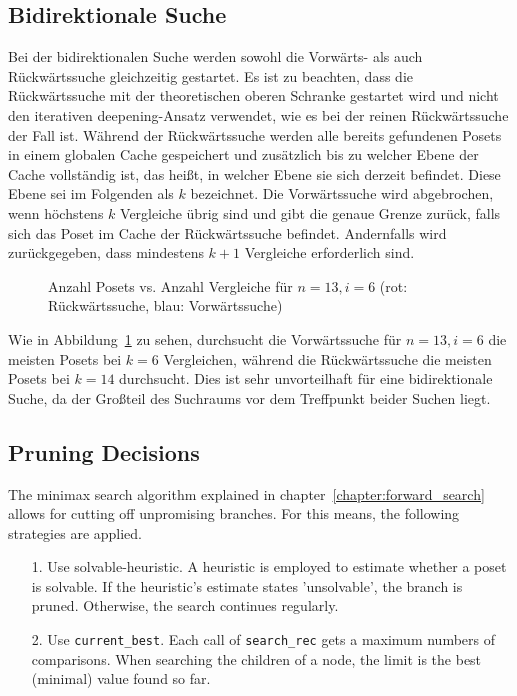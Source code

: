 \documentclass[10pt,journal,compsoc]{IEEEtran}
\begin{document}
\subsection{Bidirektionale Suche} \label{sec:bidirectional}

Bei der bidirektionalen Suche werden sowohl die Vorwärts- als auch Rückwärtssuche gleichzeitig gestartet.
Es ist zu beachten, dass die Rückwärtssuche mit der theoretischen oberen Schranke gestartet wird und nicht den iterativen deepening-Ansatz verwendet, wie es bei der reinen Rückwärtssuche der Fall ist.
Während der Rückwärtssuche werden alle bereits gefundenen Posets in einem globalen Cache gespeichert und zusätzlich bis zu welcher Ebene der Cache vollständig ist, das heißt, in welcher Ebene sie sich derzeit befindet.
Diese Ebene sei im Folgenden als $k$ bezeichnet.
Die Vorwärtssuche wird abgebrochen, wenn höchstens $k$ Vergleiche übrig sind und gibt die genaue Grenze zurück, falls sich das Poset im Cache der Rückwärtssuche befindet.
Andernfalls wird zurückgegeben, dass mindestens $k + 1$ Vergleiche erforderlich sind.

\begin{figure}[h!]
  
  \centering
  \caption{Anzahl Posets vs. Anzahl Vergleiche für $n=13, i=6$ (rot: Rückwärtssuche, blau: Vorwärtssuche)}
  \label{fig:backward_forward_count}
\end{figure}

Wie in Abbildung~\ref{fig:backward_forward_count} zu sehen, durchsucht die Vorwärtssuche für $n = 13, i = 6$ die meisten Posets bei $k = 6$ Vergleichen, während die Rückwärtssuche die meisten Posets bei $k = 14$ durchsucht.
Dies ist sehr unvorteilhaft für eine bidirektionale Suche, da der Großteil des Suchraums vor dem Treffpunkt beider Suchen liegt.



\subsection{Pruning Decisions}
The minimax search algorithm explained in chapter~\ref{chapter:forward_search} allows for cutting off unpromising branches. For this means, the following strategies are applied.

\begin{enumerate}
  \item[1.]
        Use solvable-heuristic. A heuristic is employed to estimate whether a poset is solvable. If the heuristic's estimate states 'unsolvable', the branch is pruned.
        Otherwise, the search continues regularly.
  \item[2.]
        Use \texttt{current\_best}. Each call of \texttt{search\_rec} gets a maximum numbers of comparisons.
        When searching the children of a node, the limit is the best (minimal) value found so far.
\end{enumerate}
\end{document}
